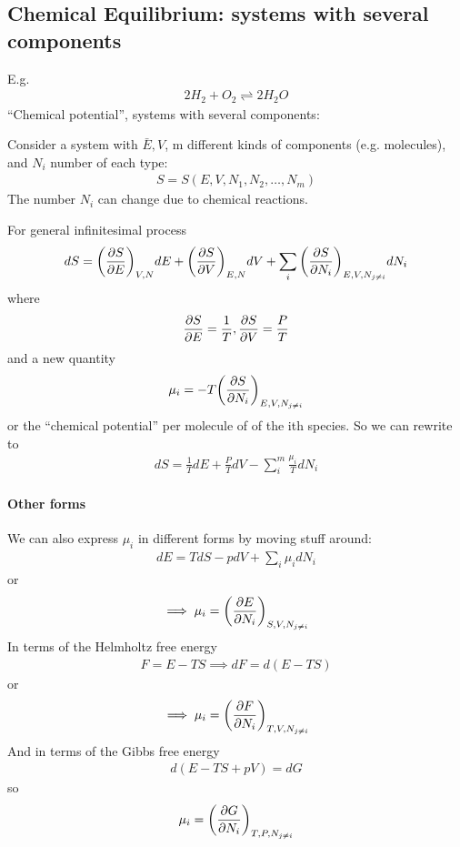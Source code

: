\documentclass[../main.tex]{subfiles}
\begin{document}
\newpage
{}
\subsection{Chemical Equilibrium: systems with several components}
E.g. 
\begin{align*}
    2H_2 + O_2 \rightleftharpoons 2H_2O
\end{align*}
``Chemical potential'', systems with several components:

Consider a system with $\bar E, V$, m different kinds of components (e.g. molecules),
and $N_i$ number of each type:
\begin{align*}
    S = S(E, V, N_1, N_2, \dots, N_m)
\end{align*}
The number $N_i$ can change due to chemical reactions.

For general infinitesimal process
\begin{align*}
    dS = \qt(\pdv{S}{E})_{V, N} dE + \qt(\pdv{S}{V})_{E, N} dV + \sum_i \qt(\pdv{S}{N_i})_{E, V, N_{j\neq i}} dN_i
\end{align*}
where
\begin{align*}
    \pdv{S}{E} = \frac{1}{T}, \pdv{S}{V} = \frac{P}{T}
\end{align*}
and a new quantity
\begin{align*}
    \mu_i = - T \qt(\pdv{S}{N_i})_{E, V, N_{j\neq i}}
\end{align*}
or the ``chemical potential'' per molecule of of the ith species.
So we can rewrite to
\begin{align*}
    dS = \frac{1}{T} dE + \frac{P}{T} dV - \sum_i^m \frac{\mu_i}{T} dN_i
\end{align*}

\paragraph{Other forms} We can also express $\mu_i$ in different forms by moving stuff around:
\begin{align*}
    dE = T dS - p dV + \sum_i \mu_i dN_i
\end{align*}
or
\begin{align*}
    \implies \mu_i = \qt(\pdv{E}{N_i})_{S, V, N_{j\neq i}}
\end{align*}
In terms of the Helmholtz free energy
\begin{align*}
    F = E - TS \implies dF = d(E - TS)
\end{align*}
or
\begin{align*}
    \implies \mu_i = \qt(\pdv{F}{N_i})_{T, V, N_{j\neq i}}
\end{align*}
And in terms of the Gibbs free energy
\begin{align*}
    d(E - TS + pV) = dG
\end{align*}
so 
\begin{align*}
    \mu_i = \qt(\pdv{G}{N_i})_{T, P, N_{j\neq i}}
\end{align*}
\end{document}
